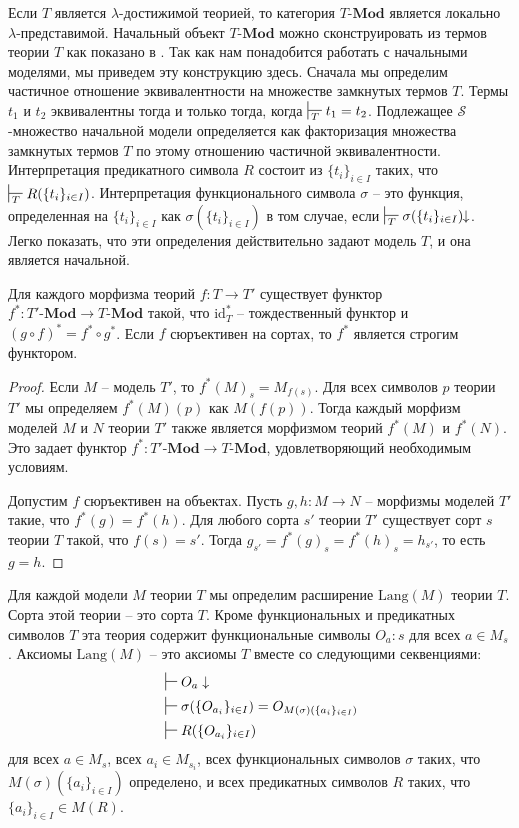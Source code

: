\documentclass[reqno]{amsart}
\theoremstyle{definition}
\theoremstyle{remark}
\newcommand{\bcat}[1]{\mathbf{#1}}
\newcommand{\Mod}[1]{#1\text{-}\bcat{Mod}}
\newcommand{\fs}[1]{\mathrm{#1}}
\newcommand{\Lang}{\fs{Lang}}
\begin{document}
Если $T$ является $\lambda$-достижимой теорией, то категория $\Mod{T}$ является локально $\lambda$-представимой.
Начальный объект $\Mod{T}$ можно сконструировать из термов теории $T$ как показано в \cite[Theorem~22]{PHL}.
Так как нам понадобится работать с начальными моделями, мы приведем эту конструкцию здесь.
Сначала мы определим частичное отношение эквивалентности на множестве замкнутых термов $T$.
Термы $t_1$ и $t_2$ эквивалентны тогда и только тогда, когда $\sststile{T}{} t_1 = t_2$.
Подлежащее $\mathcal{S}$-множество начальной модели определяется как факторизация множества замкнутых термов $T$ по этому отношению частичной эквивалентности.
Интерпретация предикатного символа $R$ состоит из $\{ t_i \}_{i \in I}$ таких, что $\sststile{T}{} R(\{ t_i \}_{i \in I})$.
Интерпретация функционального символа $\sigma$ -- это функция, определенная на $\{ t_i \}_{i \in I}$ как $\sigma(\{ t_i \}_{i \in I})$ в том случае, если $\sststile{T}{} \sigma(\{ t_i \}_{i \in I})\!\!\downarrow$.
Легко показать, что эти определения действительно задают модель $T$, и она является начальной.

\begin{prop}
Для каждого морфизма теорий $f : T \to T'$ существует функтор $f^* : \Mod{T'} \to \Mod{T}$ такой, что $\fs{id}_T^*$ -- тождественный функтор и $(g \circ f)^* = f^* \circ g^*$.
Если $f$ сюръективен на сортах, то $f^*$ является строгим функтором.
\end{prop}
\begin{proof}
Если $M$ -- модель $T'$, то $f^*(M)_s = M_{f(s)}$.
Для всех символов $p$ теории $T'$ мы определяем $f^*(M)(p)$ как $M(f(p))$.
Тогда каждый морфизм моделей $M$ и $N$ теории $T'$ также является морфизмом теорий $f^*(M)$ и $f^*(N)$.
Это задает функтор $f^* : \Mod{T'} \to \Mod{T}$, удовлетворяющий необходимым условиям.

Допустим $f$ сюръективен на объектах.
Пусть $g,h : M \to N$ -- морфизмы моделей $T'$ такие, что $f^*(g) = f^*(h)$.
Для любого сорта $s'$ теории $T'$ существует сорт $s$ теории $T$ такой, что $f(s) = s'$.
Тогда $g_{s'} = f^*(g)_s = f^*(h)_s = h_{s'}$, то есть $g = h$.
\end{proof}

Для каждой модели $M$ теории $T$ мы определим расширение $\Lang(M)$ теории $T$.
Сорта этой теории -- это сорта $T$.
Кроме функциональных и предикатных символов $T$ эта теория содержит функциональные символы $O_a : s$ для всех $a \in M_s$.
Аксиомы $\Lang(M)$ -- это аксиомы $T$ вместе со следующими секвенциями:
\begin{align*}
& \sststile{}{} O_a \downarrow \\
& \sststile{}{} \sigma(\{ O_{a_i} \}_{i \in I}) = O_{M(\sigma)(\{ a_i \}_{i \in I})} \\
& \sststile{}{} R(\{ O_{a_i} \}_{i \in I})
\end{align*}
для всех $a \in M_s$, всех $a_i \in M_{s_i}$,
всех функциональных символов $\sigma$ таких, что $M(\sigma)(\{ a_i \}_{i \in I})$ определено,
и всех предикатных символов $R$ таких, что $\{ a_i \}_{i \in I} \in M(R)$.
\end{document}
